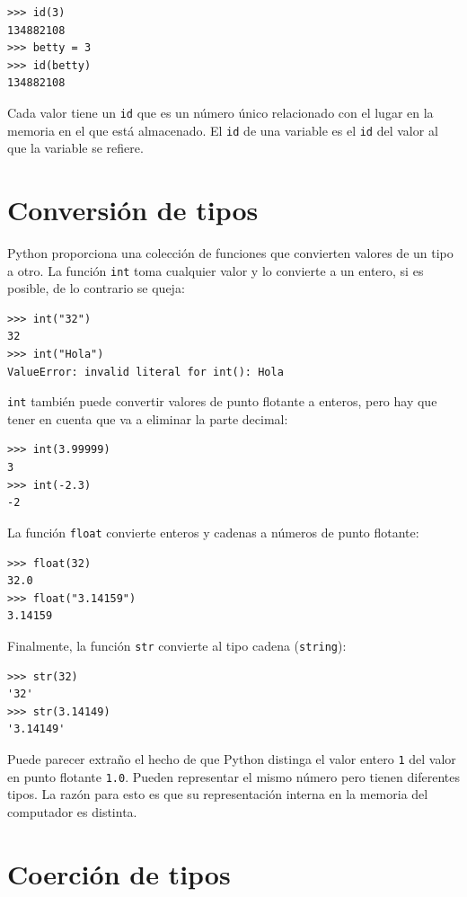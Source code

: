 \beforeverb
\begin{verbatim}
>>> id(3)
134882108
>>> betty = 3
>>> id(betty)
134882108
\end{verbatim}
\afterverb
%
Cada valor tiene un \texttt{id} que es un número único relacionado con el 
lugar en la memoria en el que está almacenado. El  \texttt{id} de una
variable es el \texttt{id} del valor al que la variable se refiere.

\section{Conversión de tipos}

Python proporciona una colección de funciones que convierten valores de un
tipo a otro. La función  \texttt{int} toma cualquier valor y lo 
convierte a un entero, si es posible, de lo contrario se queja:

\beforeverb
\begin{verbatim}
>>> int("32")
32
>>> int("Hola")
ValueError: invalid literal for int(): Hola
\end{verbatim}
\afterverb
%
\texttt{int} también puede convertir valores de punto flotante a enteros, 
pero hay que tener en cuenta que va a eliminar la parte decimal:

\beforeverb
\begin{verbatim}
>>> int(3.99999)
3
>>> int(-2.3)
-2
\end{verbatim}
\afterverb
%
La función \texttt{float} convierte enteros y cadenas a números de 
punto flotante:

\beforeverb
\begin{verbatim}
>>> float(32)
32.0
>>> float("3.14159")
3.14159
\end{verbatim}
\afterverb
%
Finalmente, la función \texttt{str} convierte al tipo cadena
(\texttt{string}):

\beforeverb
\begin{verbatim}
>>> str(32)
'32'
>>> str(3.14149)
'3.14149'
\end{verbatim}
\afterverb
%
Puede parecer extraño el hecho de que Python distinga el valor entero \texttt{1}
del valor en punto flotante  \texttt{1.0}. Pueden representar el mismo número
pero tienen diferentes tipos. La razón para esto es que su representación 
interna en la memoria del computador es distinta.


\section{Coerción de tipos}

